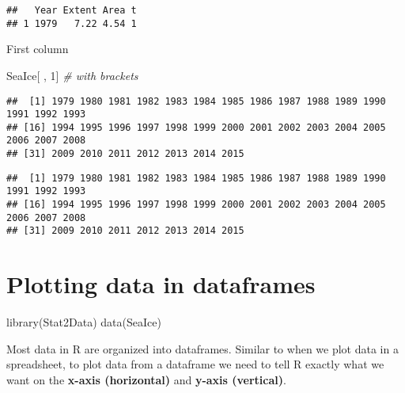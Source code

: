 \documentclass[
]{book}
\newenvironment{Shaded}{\begin{snugshade}}{\end{snugshade}}
\newcommand{\CommentTok}[1]{\textcolor[rgb]{0.56,0.35,0.01}{\textit{#1}}}
\newcommand{\DecValTok}[1]{\textcolor[rgb]{0.00,0.00,0.81}{#1}}
\newcommand{\FunctionTok}[1]{\textcolor[rgb]{0.00,0.00,0.00}{#1}}
\newcommand{\NormalTok}[1]{#1}
\newcommand{\SpecialCharTok}[1]{\textcolor[rgb]{0.00,0.00,0.00}{#1}}
\begin{document}
\begin{verbatim}
##   Year Extent Area t
## 1 1979   7.22 4.54 1
\end{verbatim}

First column

\begin{Shaded}
\begin{Highlighting}[]
\NormalTok{SeaIce[ , }\DecValTok{1}\NormalTok{] }\CommentTok{\# with brackets}
\end{Highlighting}
\end{Shaded}

\begin{verbatim}
##  [1] 1979 1980 1981 1982 1983 1984 1985 1986 1987 1988 1989 1990 1991 1992 1993
## [16] 1994 1995 1996 1997 1998 1999 2000 2001 2002 2003 2004 2005 2006 2007 2008
## [31] 2009 2010 2011 2012 2013 2014 2015
\end{verbatim}

\begin{Shaded}
\end{Shaded}

\begin{verbatim}
##  [1] 1979 1980 1981 1982 1983 1984 1985 1986 1987 1988 1989 1990 1991 1992 1993
## [16] 1994 1995 1996 1997 1998 1999 2000 2001 2002 2003 2004 2005 2006 2007 2008
## [31] 2009 2010 2011 2012 2013 2014 2015
\end{verbatim}

\hypertarget{plotting-data-in-dataframes}{%
\chapter{Plotting data in dataframes}\label{plotting-data-in-dataframes}}

\begin{Shaded}
\begin{Highlighting}[]
\FunctionTok{library}\NormalTok{(Stat2Data)}
\FunctionTok{data}\NormalTok{(SeaIce)}
\end{Highlighting}
\end{Shaded}

Most data in R are organized into dataframes. Similar to when we plot data in a spreadsheet, to plot data from a dataframe we need to tell R exactly what we want on the \textbf{x-axis (horizontal)} and \textbf{y-axis (vertical)}.
\end{document}
